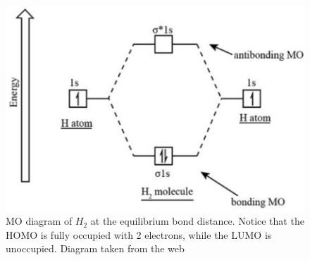 \documentclass[12pt]{caltech_thesis}
\begin{document}
\begin{figure}[h]
    \centering
    \includegraphics[width=\textwidth]{h2_mo.png}
\caption{MO diagram of $H_2$ at the equilibrium bond distance. Notice that the HOMO is fully occupied with 2 electrons, while the LUMO is unoccupied. Diagram taken from the web \autocite{noauthor_molecular_nodate}}
\label{fig:h2_mo_diagram}
\end{figure}

\printbibliography[heading=bibintoc]

\appendix
\end{document}

